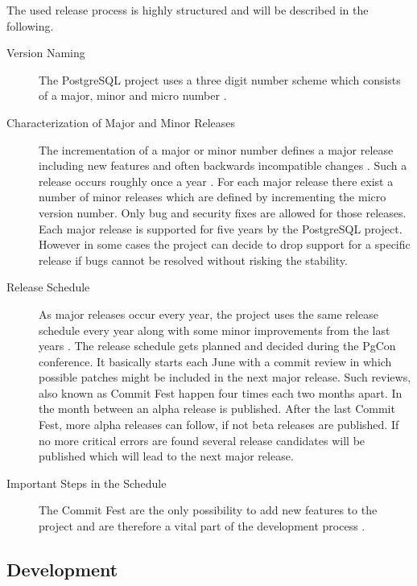 The used release process is highly structured and will be described in the
following.

\begin{description}

  \item[Version Naming] The PostgreSQL project uses a three digit number scheme
    which consists of a major, minor and micro number
    \cite{PostgreSQLVersioning}.

  \item[Characterization of Major and Minor Releases] The incrementation of a
    major or minor number defines a major release including new features and
    often backwards incompatible changes \cite{PostgreSQLVersioning}. Such a
    release occurs roughly once a year
    \cite{PostgreSQLDevelopment,PostgreSQLFAQ}. For each major release there
    exist a number of minor releases which are defined by incrementing the
    micro version number. Only bug and security fixes are allowed for those
    releases. Each major release is supported for five years by the PostgreSQL
    project. However in some cases the project can decide to drop support for a
    specific release if bugs cannot be resolved without risking the stability.

  \item[Release Schedule] As major releases occur every year, the project uses
    the same release schedule every year along with some minor improvements
    from the last years \cite{PostgreSQLDevelopment}. The release schedule gets
    planned and decided during the PgCon conference. It basically starts each
    June with a commit review in which possible patches might be included in
    the next major release. Such reviews, also known as Commit Fest happen four
    times each two months apart. In the month between an alpha release is
    published. After the last Commit Fest, more alpha releases can follow, if
    not beta releases are published. If no more critical errors are found
    several release candidates will be published which will lead to the next
    major release.

  \item[Important Steps in the Schedule] The Commit Fest are the only
    possibility to add new features to the project and are therefore a vital
    part of the development process
    \cite{PostgreSQLDevelopment,PostgreSQLCommitFest}. 

\end{description}

\subsection{Development}

